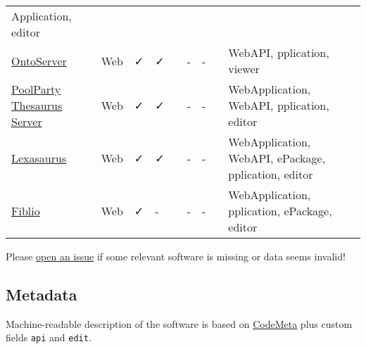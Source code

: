 \documentclass[
  DIV=10]{article}
\begin{document}
\begin{longtable}[]{@{}lllllllll@{}}
Application, editor \\
\href{https://ontoserver.csiro.au/}{OntoServer} & Web & ✓ & ✓ & & - & -
& & WebAPI, pplication, viewer \\
\href{https://www.poolparty.biz/poolparty-thesaurus-manager}{PoolParty
Thesaurus Server} & Web & ✓ & ✓ & & - & - & & WebApplication, WebAPI,
pplication, editor \\
\href{http://www.k-int.com/products/lexaurus/}{Lexasaurus} & Web & ✓ & ✓
& & - & - & & WebApplication, WebAPI, ePackage, pplication, editor \\
\href{https://www.fiblio.de/}{Fiblio} & Web & ✓ & - & & - & - & &
WebApplication, pplication, ePackage, editor \\

\end{longtable}

Please
\href{https://github.com/gbv/bartoc-vocabulary-software/issues}{open an
issue} if some relevant software is missing or data seems invalid!

\newpage
{}
\recalctypearea

\subsection{Metadata}\label{metadata}

Machine-readable description of the software is based on
\href{https://codemeta.github.io/}{CodeMeta} plus custom fields
\texttt{api} and \texttt{edit}.
\end{document}
